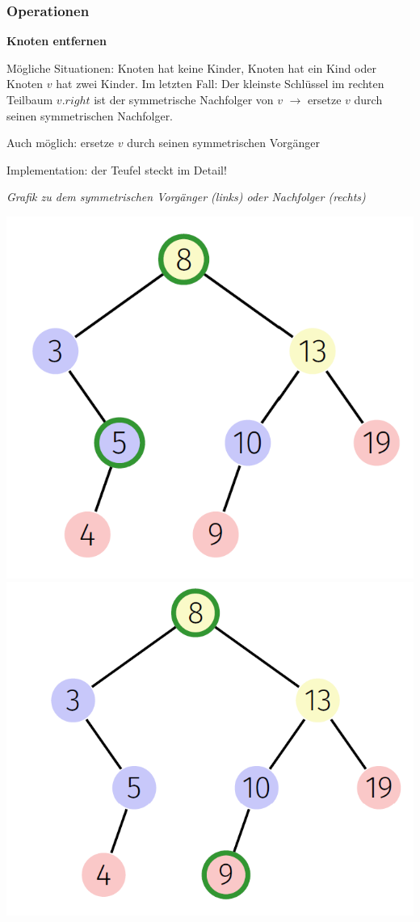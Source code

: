   \begin{sectionbox}
  \subsubsection{Operationen}\smallskip
  
  \textbf{Knoten entfernen}\par
  Mögliche Situationen: Knoten hat keine Kinder, Knoten hat ein Kind oder Knoten $v$ hat zwei Kinder.
  Im letzten Fall: Der kleinste Schlüssel im rechten Teilbaum $v.right$ ist der symmetrische Nachfolger von $v$ $\rightarrow$ ersetze $v$ durch seinen symmetrischen Nachfolger.
  \par Auch möglich: ersetze $v$ durch seinen symmetrischen Vorgänger
  \par Implementation: der Teufel steckt im Detail!
  \end{sectionbox}
  
  \begin{sectionbox}
  \textit{Grafik zu dem symmetrischen Vorgänger (links) oder Nachfolger (rechts)}\par
  \begin{center}
  \includegraphics[width = 0.4\columnwidth]{../img/symVorg.png}
  \tab \includegraphics[width = 0.4\columnwidth]{../img/symNachf.png}    
  \end{center}
  \end{sectionbox}
  
